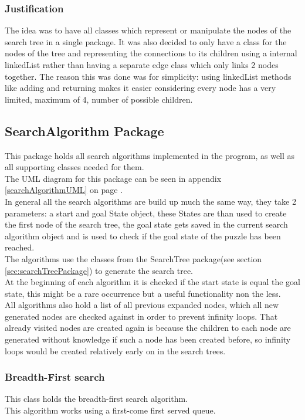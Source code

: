 \documentclass[journal]{IEEEtran}
\begin{document}
\subsubsection{Justification}
The idea was to have all classes which represent or manipulate the nodes of the search tree in a single package. It was also decided to only have a class for the nodes of the tree and representing the connections to its children using a internal linkedList rather than having a separate edge class which only links 2 nodes together. The reason this was done was for simplicity: using linkedList methods like adding and returning makes it easier considering every node has a very limited, maximum of 4, number of possible children. 

\subsection{SearchAlgorithm Package}\label{sec:searchAlgorithmPackage}
This package holds all search algorithms implemented in the program, as well as all supporting classes needed for them. \\
The UML diagram for this package can be seen in appendix \ref{searchAlgorithmUML} on page \pageref{searchAlgorithmUML}. \\

In general all the search algorithms are build up much the same way, they take 2 parameters: a start and goal State object, these States are than used to create the first node of the search tree, the goal state gets saved in the current search algorithm object and is used to check if the goal state of the puzzle has been reached. \\
The algorithms use the classes from the SearchTree package(see section \ref{sec:searchTreePackage}) to generate the search tree. \\ 
At the beginning of each algorithm it is checked if the start state is equal the goal state, this might be a rare occurrence but a useful functionality non the less. \\
All algorithms also hold a list of all previous expanded nodes, which all new generated nodes are checked against in order to prevent infinity loops. That already visited nodes are created again is because the children to each node are generated without knowledge if such a node has been created before, so infinity loops would be created relatively early on in the search trees. \\

\subsubsection{Breadth-First search}
This class holds the breadth-first search algorithm. \\
This algorithm works using a first-come first served queue. \\
\end{document}
